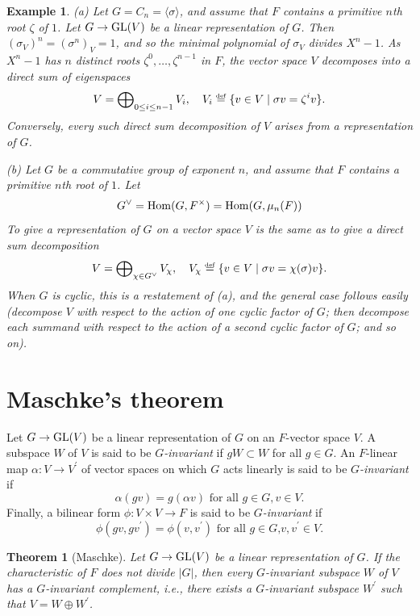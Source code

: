 \documentclass[a4paper,11pt,final]{memoir}%
\newtheorem{theorem}[X]{Theorem}
\newtheorem{example}[X]{Example}
\theoremstyle{nonumberplain}
\begin{document}
\begin{example}
\label{r2}(a) Let $G=C_{n}=\langle\sigma\rangle$, and assume that $F$ contains
a primitive $n$th root $\zeta$ of $1$. Let $G\rightarrow\operatorname{GL}(V)$ be a linear
representation of $G$. Then $(\sigma_{V})^{n}=(\sigma^{n})_{V}=1$, and so the
minimal polynomial of $\sigma_{V}$ divides $X^{n}-1$. As $X^{n}-1$ has $n$
distinct roots $\zeta^{0},\ldots,\zeta^{n-1}$ in $F$, the vector space $V$
decomposes into a direct sum of eigenspaces%
\[
V=\bigoplus\nolimits_{0\leq i\leq n-1}V_{i},\quad V_{i}%
\overset{\df}{=}\{v\in V\mid\sigma v=\zeta^{i}v\}\text{.}%
\]
Conversely, every such direct sum decomposition of $V$ arises from a
representation of $G$.

(b) Let $G$ be a commutative group of exponent $n$, and assume that $F$
contains a primitive $n$th root of $1$. Let
\[
G^{\vee}=\operatorname{Hom}(G,F^{\times})=\operatorname{Hom}(G,\mu_{n}(F))
\]
To give a representation of $G$ on a vector space $V$ is the same as to give a
direct sum decomposition%
\[
V=\bigoplus\nolimits_{\chi\in G^{\vee}}V_{\chi},\quad V_{\chi}%
\overset{\df}{=}\{v\in V\mid\sigma v=\chi(\sigma)v\}\text{.}%
\]
When $G$ is cyclic, this is a restatement of (a), and the general case follows
easily (decompose $V$ with respect to the action of one cyclic factor of $G$;
then decompose each summand with respect to the action of a second cyclic
factor of $G$; and so on).
\end{example}

\section{Maschke's theorem}

Let $G\rightarrow\operatorname{GL}(V)$ be a linear representation of $G$ on an $F$-vector
space $V$. A subspace $W$ of $V$ is said to be $G$\emph{-invariant} if
$gW\subset W$ for all $g\in G$. An $F$-linear map $\alpha\colon V\rightarrow
V^{\prime}$ of vector spaces on which $G$ acts linearly is said to be
$G$\emph{-invariant} if
\[
\alpha(gv)=g(\alpha v)\text{ for all }g\in G,v\in V.
\]
Finally, a bilinear form $\phi\colon V\times V\rightarrow F$ is said to be
$G$\emph{-invariant} if%
\[
\phi(gv,gv^{\prime})=\phi(v,v^{\prime})\text{ for all }g\in G\text{,
}v,v^{\prime}\in V.
\]


\begin{theorem}
[Maschke]\label{r3}%
%
Let $G\rightarrow\operatorname{GL}(V)$ be a linear representation of $G$. If the
characteristic of $F$ does not divide $|G|$, then every $G$-invariant subspace
$W$ of $V$ has a $G$-invariant complement, i.e., there exists a $G$-invariant
subspace $W^{\prime}$ such that $V=W\oplus W^{\prime}$.
\end{theorem}
\end{document}
